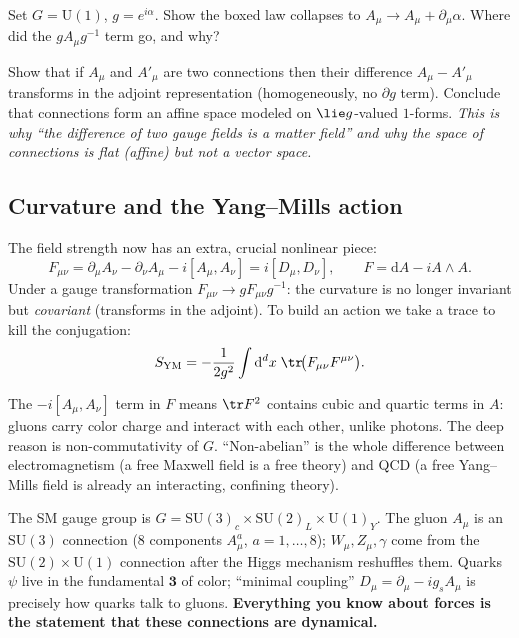 \documentclass[11pt]{article}
\newcommand{\dd}{\mathrm{d}}                 %
\newcommand{\Uone}{\mathrm{U}(1)}
\begin{document}
\begin{xca}
Set $G=\Uone$, $g=e^{i\alpha}$. Show the boxed law collapses to
$A_\mu \to A_\mu + \partial_\mu\alpha$. Where did the $gA_\mu g^{-1}$ term go, and why?
\end{xca}

\begin{xca}
Show that if $A_\mu$ and $A'_\mu$ are two connections then their difference
$A_\mu - A'_\mu$ transforms in the adjoint representation (homogeneously, no
$\partial g$ term). Conclude that connections form an affine space modeled on
$\lie g$-valued $1$-forms. \emph{This is why ``the difference of two gauge fields is a
matter field'' and why the space of connections is flat (affine) but not a vector
space.}
\end{xca}

\subsection{Curvature and the Yang--Mills action}

The field strength now has an extra, crucial nonlinear piece:
\[
F_{\mu\nu} = \partial_\mu A_\nu - \partial_\nu A_\mu - i[A_\mu,A_\nu] = i[D_\mu,D_\nu],
\qquad
F = \dd A - iA\wedge A.
\]
Under a gauge transformation $F_{\mu\nu}\to g F_{\mu\nu} g^{-1}$: the curvature is no
longer invariant but \emph{covariant} (transforms in the adjoint). To build an action
we take a trace to kill the conjugation:
\[
S_{\mathrm{YM}} = -\frac{1}{2g^2}\int \dd^dx\;\tr\!\big(F_{\mu\nu}F^{\mu\nu}\big).
\]

\begin{iintuition}
The $-i[A_\mu,A_\nu]$ term in $F$ means $\tr F^2$ contains cubic and quartic terms in
$A$: gluons carry color charge and interact with each other, unlike photons. The deep
reason is non-commutativity of $G$. ``Non-abelian'' is the whole difference between
electromagnetism (a free Maxwell field is a free theory) and QCD (a free Yang--Mills
field is already an interacting, confining theory).
\end{iintuition}

\begin{eexample}
The SM gauge group is $G = \mathrm{SU}(3)_c\times\mathrm{SU}(2)_L\times\Uone_Y$. The
gluon $A_\mu$ is an $\mathrm{SU}(3)$ connection (8 components $A_\mu^a$, $a=1,\dots,8$);
$W_\mu, Z_\mu, \gamma$ come from the $\mathrm{SU}(2)\times\Uone$ connection after the
Higgs mechanism reshuffles them. Quarks $\psi$ live in the fundamental $\mathbf 3$ of
color; ``minimal coupling'' $D_\mu = \partial_\mu - ig_s A_\mu$ is precisely how quarks
talk to gluons. \textbf{Everything you know about forces is the statement that these
connections are dynamical.}
\end{eexample}
\end{document}

